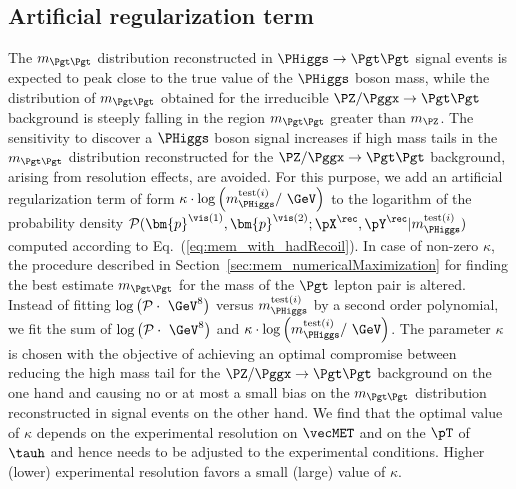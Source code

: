 \subsection{Artificial regularization term}
\label{sec:mem_logM}

The $m_{\Pgt\Pgt}$ distribution reconstructed in $\PHiggs \to \Pgt\Pgt$ signal events is expected to peak close to the true value of the $\PHiggs$ boson mass,
while the distribution of $m_{\Pgt\Pgt}$ obtained for the irreducible
$\PZ/\Pggx \to \Pgt\Pgt$ background is steeply falling in the region
$m_{\Pgt\Pgt}$ greater than $m_{\PZ}$.
The sensitivity to discover a $\PHiggs$ boson signal increases if high mass tails in the $m_{\Pgt\Pgt}$ distribution reconstructed 
for the $\PZ/\Pggx \to \Pgt\Pgt$ background, arising from resolution effects, are avoided.
For this purpose,
we add an artificial regularization term of form 
$\kappa \cdot \log \left( m_{\PHiggs}^{\textrm{test}(i)} / \mbox{~\GeV} \right)$ 
to the logarithm of the probability density $\mathcal{P}(\bm{p}^{\vis(1)},\bm{p}^{\vis(2)};\pX^{\rec},\pY^{\rec}|m_{\PHiggs}^{\textrm{test}(i)})$
computed according to Eq.~(\ref{eq:mem_with_hadRecoil}).
In case of non-zero $\kappa$,
the procedure described in Section~\ref{sec:mem_numericalMaximization} for finding the best estimate $m_{\Pgt\Pgt}$ for the mass of the $\Pgt$ lepton pair is altered.
Instead of fitting 
$\log \left( \mathcal{P} \cdot \mbox{~\GeV}^{8} \right)$ 
versus $m_{\PHiggs}^{\textrm{test}(i)}$ by a second order polynomial,
we fit the sum of $\log \left( \mathcal{P} \cdot \mbox{~\GeV}^{8} \right)$
and $\kappa \cdot \log \left( m_{\PHiggs}^{\textrm{test}(i)} / \mbox{~\GeV} \right)$.
The parameter $\kappa$ is chosen with the objective of achieving an
optimal compromise between reducing the high mass tail for the
$\PZ/\Pggx \to \Pgt\Pgt$ background on the one hand and 
causing no or at most a small bias on the $m_{\Pgt\Pgt}$ distribution
reconstructed in signal events on the other hand.
We find that the optimal value of $\kappa$ depends on the experimental
resolution on $\vecMET$ and on the $\pT$ of $\tauh$ and hence needs to be adjusted to the experimental conditions.
Higher (lower) experimental resolution favors a small (large) value of $\kappa$. 

